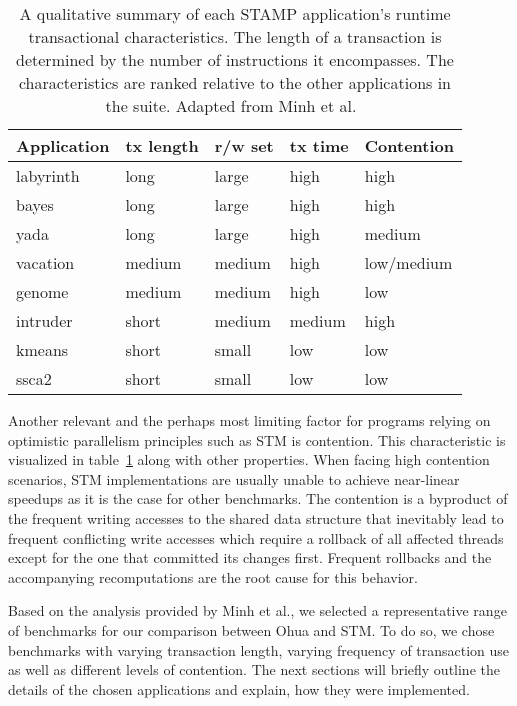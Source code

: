 \begin{table}
    \centering
    \begin{tabular}{|l|l|l|l|l|}
        \hline
        \textbf{Application} & \textbf{tx length} & \textbf{r/w set} & \textbf{tx time} & \textbf{Contention}\\\hline\hline
        labyrinth & long & large & high & high\\\hline
        bayes & long & large & high & high\\\hline
        yada & long & large & high & medium\\\hline
        vacation & medium & medium & high & low/medium\\\hline
        genome & medium & medium & high & low\\\hline
        intruder & short & medium & medium & high\\\hline
        kmeans & short & small & low & low\\\hline
        ssca2 & short & small & low & low\\\hline
    \end{tabular}
    \caption{A qualitative summary of each STAMP application's runtime transactional characteristics. The length of a transaction is determined by the number of instructions it encompasses. The characteristics are ranked relative to the other applications in the suite. Adapted from Minh et al.~\cite{minh2008stamp}}
    \label{tab:experiments:categorization}
\end{table}

Another relevant and the perhaps most limiting factor for programs relying on optimistic parallelism principles such as STM is contention.
This characteristic is visualized in table~\ref{tab:experiments:categorization} along with other properties.
When facing high contention scenarios, STM implementations are usually unable to achieve near-linear speedups as it is the case for other benchmarks.
The contention is a byproduct of the frequent writing accesses to the shared data structure that inevitably lead to frequent conflicting write accesses which require a rollback of all affected threads except for the one that committed its changes first.
Frequent rollbacks and the accompanying recomputations are the root cause for this behavior.

Based on the analysis provided by Minh et al., we selected a representative range of benchmarks for our comparison between Ohua and STM.
To do so, we chose benchmarks with varying transaction length, varying frequency of transaction use as well as different levels of contention.
The next sections will briefly outline the details of the chosen applications and explain, how they were implemented.


